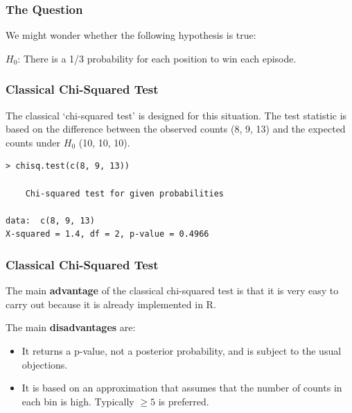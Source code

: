 \documentclass{beamer}
\begin{document}
\begin{frame}
\frametitle{The Question}
We might wonder whether the following hypothesis is true:\\[0.5em]\pause

$H_0$: There is a 1/3 probability for each position to win each episode.

\end{frame}

\begin{frame}[fragile]
\frametitle{Classical Chi-Squared Test}
The classical `chi-squared test' is designed for this situation.
The test statistic is based on the difference between the observed counts
(8, 9, 13) and the expected counts under $H_0$ (10, 10, 10).
\pause
\begin{verbatim}
> chisq.test(c(8, 9, 13))

	Chi-squared test for given probabilities

data:  c(8, 9, 13)
X-squared = 1.4, df = 2, p-value = 0.4966
\end{verbatim}

\end{frame}

\begin{frame}[fragile]
\frametitle{Classical Chi-Squared Test}
The main {\bf advantage} of the classical chi-squared test is that it is very
easy to carry out because it is already implemented in R.\\[0.5em]\pause

The main {\bf disadvantages} are:\pause
\begin{itemize}
\item It returns a p-value, not a posterior probability, and is subject to the
usual objections.\pause
\item It is based on an approximation that assumes that the number of counts
in each bin is high. Typically $\geq 5$ is preferred.
\end{itemize}

\end{frame}
\end{document}
